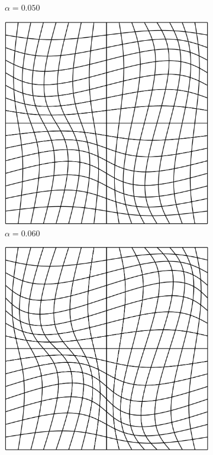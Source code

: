 \documentclass[../doc.tex]{subfiles}
\begin{document}
\begin{figure}
\begin{subfigure}{.24\textwidth}
	\caption{$\alpha = 0.050$}
\end{subfigure}\enspace
\begin{subfigure}{.24\textwidth}
	\centering
	\includegraphics[width=\textwidth]{data/img/sine60.png}
	\caption{$\alpha = 0.060$}
\end{subfigure}\enspace
\begin{subfigure}{.24\textwidth}
	\centering
	\includegraphics[width=\textwidth]{data/img/sine80.png}

\end{subfigure}
\end{figure}
\end{document}

